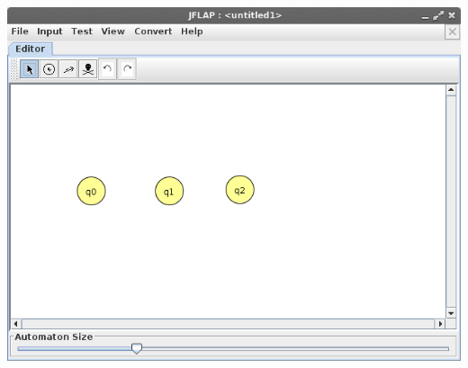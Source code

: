 \documentclass[11pt]{article}
\begin{document}
\begin{center}
		\includegraphics[scale=0.3]{img/fa_states.png}
\end{center}
\end{document}
